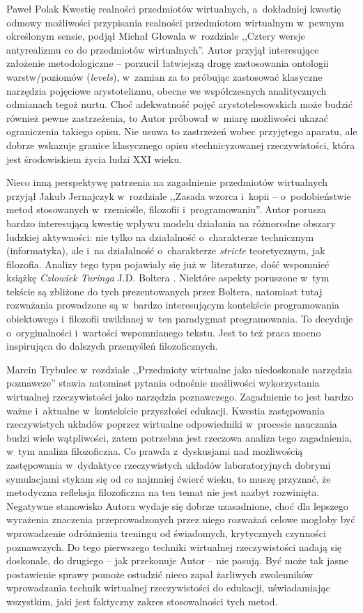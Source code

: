 \begin{recplenv}{Paweł Polak}
Kwestię realności przedmiotów wirtualnych, a~dokładniej kwestię odmowy możliwości przypisania realności przedmiotom wirtualnym w~pewnym określonym sensie, podjął Michał Głowala w~rozdziale ,,Cztery wersje antyrealizmu co do przedmiotów wirtualnych''. Autor przyjął interesujące założenie metodologiczne -- porzucił łatwiejszą drogę zastosowania ontologii warstw/poziomów (\textit{levels}), w~zamian za to próbując zastosować klasyczne narzędzia pojęciowe arystotelizmu, obecne we współczesnych analitycznych odmianach tegoż nurtu. Choć adekwatność pojęć arystotelesowskich może budzić również pewne zastrzeżenia, to Autor próbował w~miarę możliwości ukazać ograniczenia takiego opisu. Nie usuwa to zastrzeżeń wobec przyjętego aparatu, ale dobrze wskazuje granice klasycznego opisu stechnicyzowanej rzeczywistości, która jest środowiskiem życia ludzi XXI wieku.

Nieco inną perspektywę patrzenia na zagadnienie przedmiotów wirtualnych przyjął Jakub Jernajczyk w~rozdziale ,,Zasada wzorca i~kopii -- o~podobieństwie metod stosowanych w~rzemiośle, filozofii i~programowaniu''. Autor porusza bardzo interesującą kwestię wpływu modelu działania na różnorodne obszary ludzkiej aktywności: nie tylko na działalność o~charakterze technicznym (informatyka), ale i~na działalność o~charakterze \textit{stricte} teoretycznym, jak filozofia. Analizy tego typu pojawiały się już w~literaturze, dość wspomnieć książkę \textit{Człowiek Turinga} J.D. Boltera 
\parencite*{bolter_czlowiek_1990}. Niektóre aspekty poruszone w~tym tekście są zbliżone do tych prezentowanych przez Boltera, natomiast tutaj rozważania prowadzone są w~bardzo interesującym kontekście programowania obiektowego i~filozofii uwikłanej w~ten paradygmat programowania. To decyduje o~oryginalności i~wartości wspomnianego tekstu. Jest to też praca mocno inspirująca do dalszych przemyśleń filozoficznych.

Marcin Trybulec w~rozdziale ,,Przedmioty wirtualne jako niedoskonałe narzędzia poznawcze'' stawia natomiast pytania odnośnie możliwości wykorzystania wirtualnej rzeczywistości jako narzędzia poznawczego. Zagadnienie to jest bardzo ważne i~aktualne w~kontekście przyszłości edukacji. Kwestia zastępowania rzeczywistych układów poprzez wirtualne odpowiedniki w~procesie nauczania budzi wiele wątpliwości, zatem potrzebna jest rzeczowa analiza tego zagadnienia, w~tym analiza filozoficzna. Co prawda z~dyskusjami nad możliwością zastępowania w~dydaktyce rzeczywistych układów laboratoryjnych dobrymi symulacjami stykam się od co najmniej ćwierć wieku, to muszę przyznać, że metodyczna refleksja filozoficzna na ten temat nie jest nazbyt rozwinięta. Negatywne stanowisko Autora wydaje się dobrze uzasadnione, choć dla lepszego wyrażenia znaczenia przeprowadzonych przez niego rozważań celowe mogłoby być wprowadzenie odróżnienia treningu od świadomych, krytycznych czynności poznawczych. Do tego pierwszego techniki wirtualnej rzeczywistości nadają się doskonale, do drugiego -- jak przekonuje Autor -- nie pasują. Być może tak jasne postawienie sprawy pomoże ostudzić nieco zapał żarliwych zwolenników wprowadzania technik wirtualnej rzeczywistości do edukacji, uświadamiając wszystkim, jaki jest faktyczny zakres stosowalności tych metod.


\end{recplenv}
